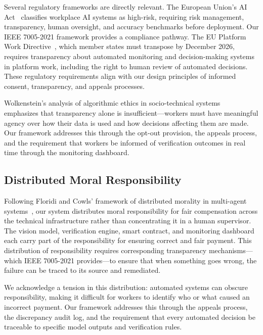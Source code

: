 \documentclass[10pt,twocolumn]{article}
\begin{document}
Several regulatory frameworks are directly relevant. The European Union's AI Act~\cite{euai2024} classifies workplace AI systems as high-risk, requiring risk management, transparency, human oversight, and accuracy benchmarks before deployment. Our IEEE 7005-2021 framework provides a compliance pathway. The EU Platform Work Directive~\cite{euplatform2024}, which member states must transpose by December 2026, requires transparency about automated monitoring and decision-making systems in platform work, including the right to human review of automated decisions. These regulatory requirements align with our design principles of informed consent, transparency, and appeals processes.

Wolkenstein's analysis of algorithmic ethics in socio-technical systems~\cite{wolkenstein2024healthy} emphasizes that transparency alone is insufficient---workers must have meaningful agency over how their data is used and how decisions affecting them are made. Our framework addresses this through the opt-out provision, the appeals process, and the requirement that workers be informed of verification outcomes in real time through the monitoring dashboard.

\subsection{Distributed Moral Responsibility}

Following Floridi and Cowls' framework of distributed morality in multi-agent systems~\cite{floridi2019unified}, our system distributes moral responsibility for fair compensation across the technical infrastructure rather than concentrating it in a human supervisor. The vision model, verification engine, smart contract, and monitoring dashboard each carry part of the responsibility for ensuring correct and fair payment. This distribution of responsibility requires corresponding transparency mechanisms---which IEEE 7005-2021 provides---to ensure that when something goes wrong, the failure can be traced to its source and remediated.

We acknowledge a tension in this distribution: automated systems can obscure responsibility, making it difficult for workers to identify who or what caused an incorrect payment. Our framework addresses this through the appeals process, the discrepancy audit log, and the requirement that every automated decision be traceable to specific model outputs and verification rules.

\end{document}
